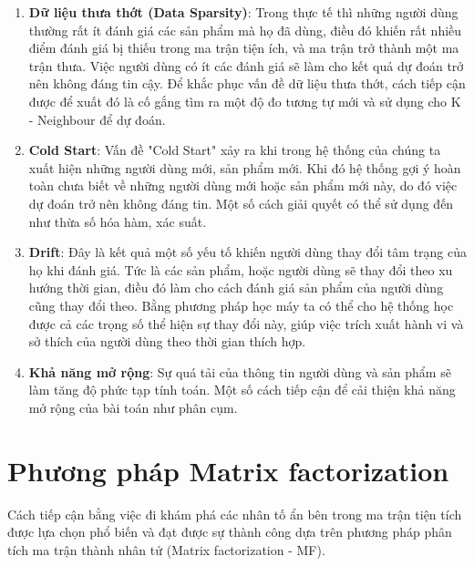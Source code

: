 \begin{enumerate}
    \item \textbf{Dữ liệu thưa thớt (Data Sparsity)}: Trong thực tế thì những người dùng thường rất ít đánh giá các sản phẩm mà họ đã dùng, điều đó khiến rất nhiều điểm đánh giá bị thiếu trong ma trận tiện ích, và ma trận trở thành một ma trận thưa. Việc người dùng có ít các đánh giá sẽ làm cho kết quả dự đoán trở nên không đáng tin cậy. Để khắc phục vấn đề dữ liệu thưa thớt, cách tiếp cận được để xuất đó là cố gắng tìm ra một độ đo tương tự mới và sử dụng cho K - Neighbour để dự đoán.
    \item \textbf{Cold Start}: Vấn đề "Cold Start" xảy ra khi trong hệ thống của chúng ta xuất hiện những người dùng mới, sản phẩm mới. Khi đó hệ thống gợi ý hoàn toàn chưa biết về những người dùng mới hoặc sản phẩm mới này, do đó việc dự đoán trở nên không đáng tin. Một số cách giải quyết có thể sử dụng đến như thừa số hóa hàm, xác suất.
    \item \textbf{Drift}: Đây là kết quả một số yếu tố khiến người dùng thay đổi tâm trạng của họ khi đánh giá. Tức là các sản phẩm, hoặc người dùng sẽ thay đổi theo xu hướng thời gian, điều đó làm cho cách đánh giá sản phẩm của người dùng cũng thay đổi theo. Bằng phương pháp học máy ta có thể cho hệ thống học được cả các trọng số thể hiện sự thay đổi này, giúp việc trích xuất hành vi và sở thích của người dùng theo thời gian thích hợp.
    \item \textbf{Khả năng mở rộng}: Sự quá tải của thông tin người dùng và sản phẩm sẽ làm tăng độ phức tạp tính toán. Một số cách tiếp cận để cải thiện khả năng mở rộng của bài toán như phân cụm. 
\end{enumerate}
\section{Phương pháp Matrix factorization}
Cách tiếp cận bằng việc đi khám phá các nhân tố ẩn bên trong ma trận tiện tích được lựa chọn phổ biến và đạt được sự thành công dựa trên phương pháp phân tích ma trận thành nhân tử (Matrix factorization - MF).\\

